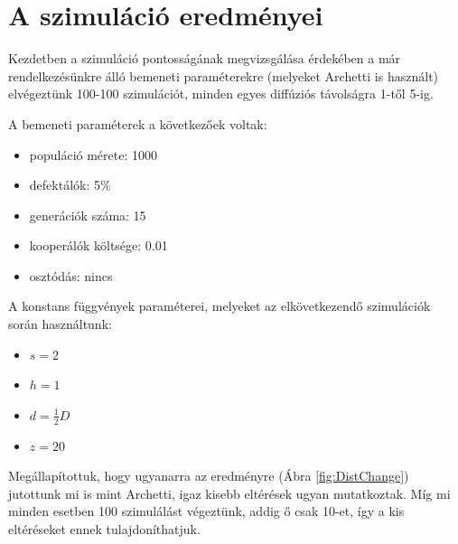 
\section{A szimuláció eredményei}

Kezdetben a szimuláció pontosságának megvizsgálása érdekében a már rendelkezésünkre álló bemeneti paraméterekre (melyeket Archetti is használt\cite{archetti2016cooperation}) elvégeztünk 100-100 szimulációt, minden egyes diffúziós távolságra 1-től 5-ig.

\begin{multicols}{2}
	A bemeneti paraméterek a következőek voltak:
	\begin{itemize}[noitemsep]
		\item populáció mérete: 1000
		\item defektálók: 5\%
		\item generációk száma: 15
		\item kooperálók költsége: 0.01
		\item osztódás: nincs
	\end{itemize}
	A konstans függvények paraméterei, melyeket az elkövetkezendő szimulációk során használtunk:
	\begin{itemize}[noitemsep]
		\item $s = 2$
		\item $h = 1$
		\item $d = \frac{1}{2}D$
		\item $z = 20$
	\end{itemize}	
\end{multicols}

Megállapítottuk, hogy ugyanarra az eredményre (Ábra \ref{fig:DistChange}) jutottunk mi is mint Archetti\cite{archetti2016cooperation}, igaz kisebb eltérések ugyan mutatkoztak. Míg mi minden esetben 100 szimulálást végeztünk, addig ő csak 10-et, így a kis eltéréseket ennek tulajdoníthatjuk.

